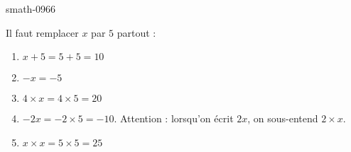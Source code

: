 
\begin{corrige}{smath-0966}

    Il faut remplacer \( x\) par \( 5\) partout :
    \begin{enumerate}
        \item
            \( x+5=5+5=10\)
        \item
            \( -x=-5\)
        \item
            \( 4\times x=4\times 5=20\)
        \item
            \( -2x=-2\times 5=-10\). Attention : lorsqu'on écrit \( 2x\), on sous-entend \( 2\times x\).
        \item
            \( x\times x=5\times 5=25\)
    \end{enumerate}

\end{corrige}
